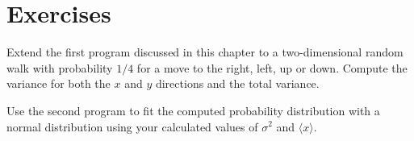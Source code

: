 \section{Exercises}
\begin{prob}
Extend the first program discussed in this chapter  
to a two-dimensional random walk with probability
$1/4$ for a move to the right, left, up or down. Compute the variance for both the $x$ and $y$
directions and the total variance.
\end{prob}
\begin{prob}
Use the second program 
to fit the computed probability distribution with a normal distribution
using your calculated values of $\sigma^2$ and $\langle x\rangle$.
\end{prob}
